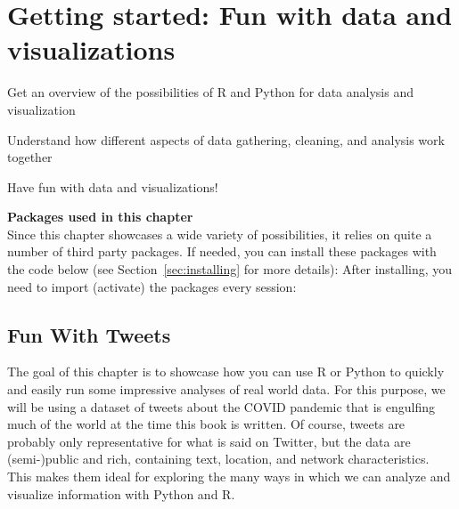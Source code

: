 \chapter{Getting started: Fun with data and visualizations}
\label{chap:fundata}

\begin{abstract}{Abstract}
  This chapter is a lightning tour of some of the cool (and informative) things you can do with R and Python.
  Starting from a dataset of tweets about COVID-19, we show how you can analyze this data using
  text analysis, network analysis, and using geographic information.
  The goal of this chapter is not to teach you all these techniques in detail,
  rather, each of the examples showcases a possibility and guides you to the chapter where it will be explained in more detail.
  So don't worry too much about understanding every line of code, but relax and enjoy the ride!
\end{abstract}


\begin{objectives}
\item Get an overview of the possibilities of R and Python for data analysis and visualization
\item Understand how different aspects of data gathering, cleaning, and analysis work together
\item Have fun with data and visualizations!
\end{objectives}

\newpage
\begin{feature}
  \textbf{Packages used in this chapter}\\
  Since this chapter showcases a wide variety of possibilities,
  it relies on quite a number of third party packages.
  If needed, you can install these packages with the code below
  (see Section~\ref{sec:installing} for more details):
  \noindent After installing, you need to import (activate) the packages every session:
\end{feature}


%
\section{Fun With Tweets}\label{sec:funtweets}

The goal of this chapter is to showcase how you can use R or Python to quickly and easily
run some impressive analyses of real world data.
For this purpose, we will be using a dataset of tweets about the COVID pandemic that is
engulfing much of the world at the time this book is written.
Of course, tweets are probably only representative for what is said on Twitter,
but the data are (semi-)public and rich, containing text, location, and network characteristics.
This makes them ideal for exploring the many ways in which we can analyze and visualize information
with Python and R. 


